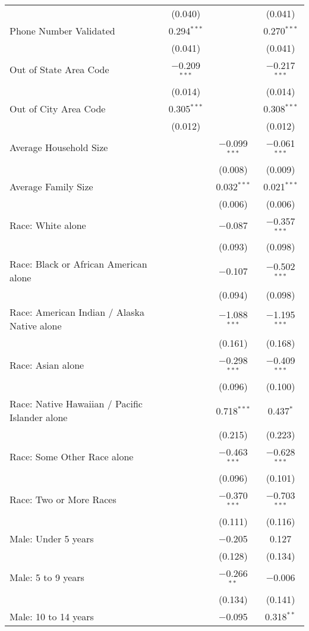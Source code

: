 \begin{longtable}{@{\extracolsep{5pt}}lccc}
  & (0.040) &  & (0.041) \\ 
  Phone Number Validated & 0.294$^{***}$ &  & 0.270$^{***}$ \\ 
  & (0.041) &  & (0.041) \\ 
  Out of State Area Code & $-$0.209$^{***}$ &  & $-$0.217$^{***}$ \\ 
  & (0.014) &  & (0.014) \\ 
  Out of City Area Code & 0.305$^{***}$ &  & 0.308$^{***}$ \\ 
  & (0.012) &  & (0.012) \\ 
  Average Household Size &  & $-$0.099$^{***}$ & $-$0.061$^{***}$ \\ 
  &  & (0.008) & (0.009) \\ 
  Average Family Size &  & 0.032$^{***}$ & 0.021$^{***}$ \\ 
  &  & (0.006) & (0.006) \\ 
  Race: White alone &  & $-$0.087 & $-$0.357$^{***}$ \\ 
  &  & (0.093) & (0.098) \\ 
  Race: Black or African American alone &  & $-$0.107 & $-$0.502$^{***}$ \\ 
  &  & (0.094) & (0.098) \\ 
  Race: American Indian / Alaska Native alone &  & $-$1.088$^{***}$ & $-$1.195$^{***}$ \\ 
  &  & (0.161) & (0.168) \\ 
  Race: Asian alone &  & $-$0.298$^{***}$ & $-$0.409$^{***}$ \\ 
  &  & (0.096) & (0.100) \\ 
  Race: Native Hawaiian / Pacific Islander alone &  & 0.718$^{***}$ & 0.437$^{*}$ \\ 
  &  & (0.215) & (0.223) \\ 
  Race: Some Other Race alone &  & $-$0.463$^{***}$ & $-$0.628$^{***}$ \\ 
  &  & (0.096) & (0.101) \\ 
  Race: Two or More Races &  & $-$0.370$^{***}$ & $-$0.703$^{***}$ \\ 
  &  & (0.111) & (0.116) \\ 
  Male: Under 5 years &  & $-$0.205 & 0.127 \\ 
  &  & (0.128) & (0.134) \\ 
  Male: 5 to 9 years &  & $-$0.266$^{**}$ & $-$0.006 \\ 
  &  & (0.134) & (0.141) \\ 
  Male: 10 to 14 years &  & $-$0.095 & 0.318$^{**}$ \\ 

\end{longtable}
